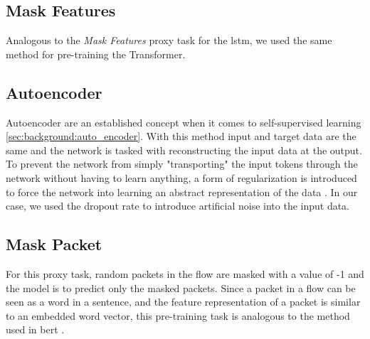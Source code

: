 \subsection{Mask Features} \label{sec:experiments_transformer_mask_features}

Analogous to the \textit{Mask Features} proxy task for the \gls{lstm}, we used the same method for pre-training the Transformer.

\subsection{Autoencoder} \label{sec:experiments_transformer_autoencoder}

Autoencoder are an established concept when it comes to self-supervised learning \ref{sec:background:auto_encoder}. With this method input and target data are the same and the network is tasked with reconstructing the input data at the output. To prevent the network from simply "transporting" the input tokens through the network without having to learn anything, a form of regularization is introduced to force the network into learning an abstract representation of the data \cite{autoencoders}. 
In our case, we used the dropout rate to introduce artificial noise into the input data.

\subsection{Mask Packet}

For this proxy task, random packets in the flow are masked with a value of -1 and the model is to predict only the masked packets. Since a packet in a flow can be seen as a word in a sentence, and the feature representation of a packet is similar to an embedded word vector, this pre-training task is analogous to the method used in \gls{bert} \cite{bert}. 

\newpage
